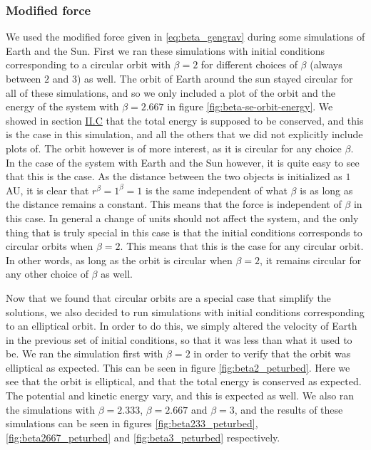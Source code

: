 \documentclass[reprint,english,notitlepage]{revtex4-1}  %
\begin{document}
\subsubsection{Modified force} \label{sec:V:b:ii}

We used the modified force given in \eqref{eq:beta_gengrav} during some simulations of Earth and the Sun. First we ran these simulations with initial conditions corresponding to a circular orbit with $\beta = 2$ for different choices of $\beta$ (always between $2$ and $3$) as well. The orbit of Earth around the sun stayed circular for all of these simulations, and so we only included a plot of the orbit and the energy of the system with $\beta = 2.667$ in figure \ref{fig:beta-se-orbit-energy}. We showed in section \hyperref[sec:II:c]{II.C} that the total energy is supposed to be conserved, and this is the case in this simulation, and all the others that we did not explicitly include plots of. The orbit however is of more interest, as it is circular for any choice $\beta$. In the case of the system with Earth and the Sun however, it is quite easy to see that this is the case. As the distance between the two objects is initialized as $1$ AU, it is clear that $r^\beta = 1^\beta = 1$ is the same independent of what $\beta$ is as long as the distance remains a constant. This means that the force is independent of $\beta$ in this case. In general a change of units should not affect the system, and the only thing that is truly special in this case is that the initial conditions corresponds to circular orbits when $\beta = 2$. This means that this is the case for any circular orbit. In other words, as long as the orbit is circular when $\beta = 2$, it remains circular for any other choice of $\beta$ as well.

Now that we found that circular orbits are a special case that simplify the solutions, we also decided to run simulations with initial conditions corresponding to an elliptical orbit. In order to do this, we simply altered the velocity of Earth in the previous set of initial conditions, so that it was less than what it used to be. We ran the simulation first with $\beta = 2$ in order to verify that the orbit was elliptical as expected. This can be seen in figure \ref{fig:beta2_peturbed}. Here we see that the orbit is elliptical, and that the total energy is conserved as expected. The potential and kinetic energy vary, and this is expected as well. We also ran the simulations with $\beta = 2.333$, $\beta = 2.667$ and $\beta = 3$, and the results of these simulations can be seen in figures \ref{fig:beta233_peturbed}, \ref{fig:beta2667_peturbed} and \ref{fig:beta3_peturbed} respectively.
\end{document}
